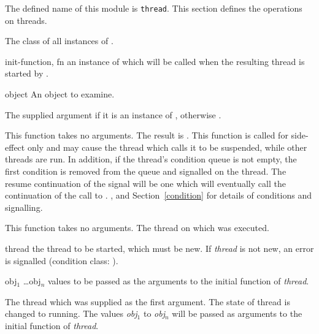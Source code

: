 \begin{optDefinition}
The defined name of this module is {\tt thread}.
This section defines the operations on threads.

%
\noindent
The class of all instances of .
%
\begin{initoptions}
%
    \item[init-function, fn] an instance of  which will be
    called when the resulting thread is started by .
%
\end{initoptions}
%
%
\begin{arguments}
    \item[object] An object to examine.
\end{arguments}
%
\result%
The supplied argument if it is an instance of , otherwise
\nil.

%
\noindent
This function takes no arguments.
%
\result%
The result is \nil.
%
\remarks%
This function is called for side-effect only and may cause the thread
which calls it to be suspended, while other threads are run.  In
addition, if the thread's condition queue is not empty, the first
condition is removed from the queue and signalled on the thread.  The
resume continuation of the signal will be one which will eventually
call the continuation of the call to .
%
\seealso%
,  and
Section~\ref{condition} for details of conditions and signalling.

\noindent
This function takes no arguments.
%
\result%
The thread on which  was executed.

\begin{arguments}
%
    \item[thread] the thread to be started, which must be new.  If {\em thread}
    is not new, an error is signalled (condition class: ).
%
    \item[obj$_1$ \ldots obj$_n$] values to be passed as the arguments to the
    initial function of {\em thread}.
%
\end{arguments}
%
\result%
The thread which was supplied as the first argument.
%
\remarks%
The state of thread is changed to running.  The values {\em obj$_1$} to {\em
    obj$_n$} will be passed as arguments to the initial function of {\em
    thread}.


\end{optDefinition}
